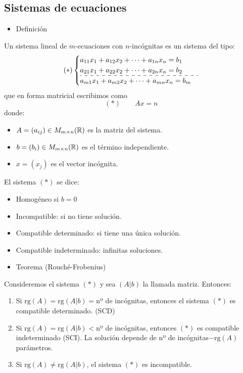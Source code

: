 \subsection{Sistemas de ecuaciones}
\begin{itemize}[label=\color{red}\textbullet, leftmargin=*]
	\item \color{lightblue}Definición
\end{itemize}
Un sistema lineal de $m$-ecuaciones con $n$-incógnitas es un sistema del tipo: \[ (\ast)\begin{cases}
	a_{11}x_1+a_{12}x_2+\cdots+a_{1n}x_n=b_1\\
	a_{21}x_1+a_{22}x_2+\cdots+a_{2n}x_n=b_2\\ \hdashline
	a_{m1}x_1+a_{m2}x_2+\cdots+a_{mn}x_n=b_m
\end{cases} \] que en forma matricial escribimos como \[ (\ast)\qquad Ax=n \] donde:
\begin{itemize}[label=\color{lightblue}\textbullet]
	\item $A=(a_{ij})\in M_{m\times n}(\operatorname{\mathbb{R}})$ es la matriz del sistema.
	\item $b=(b_i)\in M_{m\times n}(\operatorname{\mathbb{R}})$ es el término independiente.
	\item $x=(x_j)$ es el vector incógnita.
\end{itemize}
El sistema $(\ast)$ se dice:
\begin{itemize}[label=\color{lightblue}\textbullet]
	\item Homogéneo si $b=0$
	\item Incompatible: si no tiene solución.
	\item Compatible determinado: si tiene una única solución.
	\item Compatible indeterminado: infinitas soluciones.
\end{itemize}
\begin{itemize}[label=\color{red}\textbullet, leftmargin=*]
	\item \color{lightblue} Teorema (Rouché-Frobenius)
\end{itemize}
Consideremos el sistema $(\ast)$ y sea $(A|b)$ la llamada matriz. Entonces:
\begin{enumerate}[label=\color{lightblue}\arabic*)]
	\item Si $\mathrm{rg}(A)=\mathrm{rg}(A|b)=$nº de incógnitas, entonces el sistema $(\ast)$ es compatible determinado. (SCD)
	\item Si $\mathrm{rg}(A)=\mathrm{rg}(A|b)<$nº de incógnitas, entonces $(\ast)$ es compatible indeterminado (SCI). La solución depende de nº de incógnitas$-\mathrm{rg}(A)$ parámetros.
	\item Si $\mathrm{rg}(A)\neq\mathrm{rg}(A|b)$, el sistema $(\ast)$ es incompatible.
\end{enumerate}
